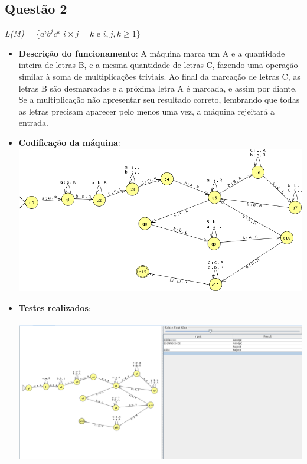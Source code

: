 \documentclass{article}
\begin{document}
\subsection*{Questão 2}
\textit{L(M)} = \{$a^{i}b^{j}c^{k}$ \vert $ i \times j = k $ e $i, j, k \geq 1$\}
\begin{itemize}
    \item \textbf{Descrição do funcionamento}: A máquina marca um A e a quantidade inteira de letras B, e a mesma quantidade de letras C, fazendo uma operação similar à soma de multiplicações triviais. Ao final da marcação de letras C, as letras B são desmarcadas e a próxima letra A é marcada, e assim por diante. Se a multiplicação não apresentar seu resultado correto, lembrando que todas as letras precisam aparecer pelo menos uma vez, a máquina rejeitará a entrada.
    \item \textbf{Codificação da máquina}: \\
    \includegraphics[scale=0.5]{questao2_ss.png}
	\item \textbf{Testes realizados}: \\ \\
    \includegraphics[width=\textwidth]{questao2_inputs.png}
\end{itemize}
\newpage
\end{document}
